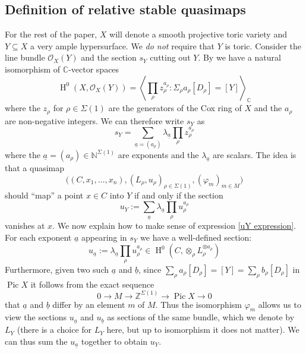 \documentclass[10pt]{amsart}
\newcommand{\Z}{\mathbb{Z}}
\newcommand{\N}{\mathbb{N}}
\newcommand{\OO}{\mathcal{O}}
\renewcommand{\to}{\rightarrow}
\newcommand{\Pic}{\operatorname{Pic}}
\newcommand{\CC}{\mathbb{C}}
\newcommand{\HH}{\operatorname{H}}
\theoremstyle{definition}
\theoremstyle{definition}
\begin{document}
\subsection{Definition of relative stable quasimaps} \label{Subsection relative stable quasimaps}

For the rest of the paper, $X$ will denote a smooth projective toric variety and $Y \subseteq X$ a very ample hypersurface. We \emph{do not} require that $Y$ is toric.
Consider the line bundle $\OO_X(Y)$ and the section $s_Y$ cutting out $Y$. By \cite{CoxRing} we have a natural isomorphism of $\CC$-vector spaces
\begin{equation*} \HH^0(X,\OO_X(Y)) = \left\langle \prod_{\rho} z_\rho^{a_\rho} : \Sigma_\rho a_\rho [D_\rho] = [Y] \right\rangle_{\CC} \end{equation*}
where the $z_\rho$ for $\rho \in \Sigma(1)$ are the generators of the Cox ring of $X$ and the $a_\rho$ are non-negative integers. We can therefore write $s_Y$ as
\begin{equation*} s_Y = \sum_{\underline{a}=(a_\rho)} \lambda_{\underline{a}} \prod_\rho z_\rho^{a_\rho} \end{equation*}
where the $\underline{a} = (a_\rho) \in \N^{\Sigma(1)}$ are exponents and the $\lambda_{\underline{a}}$ are scalars. The idea is that a quasimap
\begin{equation*} \big((C,x_1,\ldots,x_n), (L_\rho,u_\rho)_{\rho \in \Sigma(1)}, (\varphi_m)_{m \in M}\big) \end{equation*}
should ``map'' a point $x \in C$ into $Y$ if and only if the section
\begin{equation} \label{uY expression} u_Y := \sum_{\underline{a}} \lambda_{\underline{a}} \prod_\rho u_\rho^{a_\rho} \end{equation}
vanishes at $x$. We now explain how to make sense of expression \eqref{uY expression}. For each exponent $\underline{a}$ appearing in $s_Y$ we have a well-defined section:
\begin{equation*} u_{\underline{a}} := \lambda_{\underline{a}} \prod_\rho u_\rho^{a_\rho} \in \HH^0(C,\otimes_\rho L_\rho^{\otimes a_\rho}) \end{equation*}
Furthermore, given two such $\underline{a}$ and $\underline{b}$, since $\sum_\rho a_\rho [D_\rho] = [Y] = \sum_\rho b_\rho [D_\rho]$ in $\Pic{X}$ it follows from the exact sequence
\begin{equation*} 0 \to M \to \Z^{\Sigma(1)} \to \Pic{X} \to 0 \end{equation*}
that $\underline{a}$ and $\underline{b}$ differ by an element $m$ of $M$. Thus the isomorphism $\varphi_m$ allows us to view the sections $u_{\underline{a}}$ and $u_{\underline{b}}$ as sections of the same bundle, which we denote by $L_Y$ (there is a choice for $L_Y$ here, but up to isomorphism it does not matter). We can thus sum the $u_{\underline{a}}$ together to obtain $u_Y$.
\end{document}
